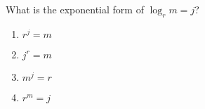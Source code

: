 \bigskip

\item What is the exponential form of $\log_r m =j$?

    \begin{enumerate}
    \item $r^j=m$
    \item $j^r=m$
    \item $m^j=r$
    \item $r^m=j$
    \end{enumerate}


